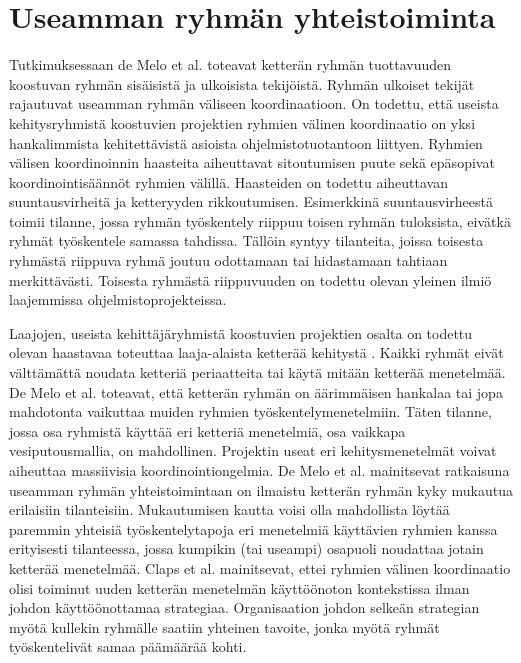 \section{Useamman ryhmän yhteistoiminta}

Tutkimuksessaan de Melo et al. \cite{DEOMELO2013412} toteavat ketterän ryhmän tuottavuuden koostuvan ryhmän sisäisistä ja ulkoisista tekijöistä. Ryhmän ulkoiset tekijät rajautuvat useamman ryhmän väliseen koordinaatioon. On todettu, että useista kehitysryhmistä koostuvien projektien ryhmien välinen koordinaatio on yksi hankalimmista kehitettävistä asioista ohjelmistotuotantoon liittyen. Ryhmien välisen koordinoinnin haasteita aiheuttavat sitoutumisen puute sekä epäsopivat koordinointisäännöt ryhmien välillä. Haasteiden on todettu aiheuttavan suuntausvirheitä ja ketteryyden rikkoutumisen. Esimerkkinä suuntausvirheestä toimii tilanne, jossa ryhmän työskentely riippuu toisen ryhmän tuloksista, eivätkä ryhmät työskentele samassa tahdissa. Tällöin syntyy tilanteita, joissa toisesta ryhmästä riippuva ryhmä joutuu odottamaan tai hidastamaan tahtiaan merkittävästi. Toisesta ryhmästä riippuvuuden on todettu olevan yleinen ilmiö laajemmissa ohjelmistoprojekteissa.

Laajojen, useista kehittäjäryhmistä koostuvien projektien osalta on todettu olevan haastavaa toteuttaa laaja-alaista ketterää kehitystä \cite{DEOMELO2013412}. Kaikki ryhmät eivät välttämättä noudata ketteriä periaatteita tai käytä mitään ketterää menetelmää. De Melo et al. \cite{DEOMELO2013412} toteavat, että ketterän ryhmän on äärimmäisen hankalaa tai jopa mahdotonta vaikuttaa muiden ryhmien työskentelymenetelmiin. Täten tilanne, jossa osa ryhmistä käyttää eri ketteriä menetelmiä, osa vaikkapa vesiputousmallia, on mahdollinen. Projektin useat eri kehitysmenetelmät voivat aiheuttaa massiivisia koordinointiongelmia. De Melo et al. mainitsevat ratkaisuna useamman ryhmän yhteistoimintaan on ilmaistu ketterän ryhmän kyky mukautua erilaisiin tilanteisiin. Mukautumisen kautta voisi olla mahdollista löytää paremmin yhteisiä työskentelytapoja eri menetelmiä käyttävien ryhmien kanssa erityisesti tilanteessa, jossa kumpikin (tai useampi) osapuoli noudattaa jotain ketterää menetelmää. Claps et al. \cite{CLAPS201521} mainitsevat, ettei ryhmien välinen koordinaatio olisi toiminut uuden ketterän menetelmän käyttöönoton kontekstissa ilman johdon käyttöönottamaa strategiaa. Organisaation johdon selkeän strategian myötä kullekin ryhmälle saatiin yhteinen tavoite, jonka myötä ryhmät työskentelivät samaa päämäärää kohti.
